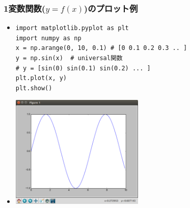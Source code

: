 \documentclass[10pt,dvipdfmx]{beamer}
\begin{document}
\begin{frame}[fragile]
\frametitle{1変数関数($y = f(x)$)のプロット例}
\begin{itemize}
\item []
\begin{lstlisting}[basicstyle=\ttfamily\scriptsize]
import matplotlib.pyplot as plt
import numpy as np
x = np.arange(0, 10, 0.1) # [0 0.1 0.2 0.3 .. ]
y = np.sin(x)  # universal関数
# y = [sin(0) sin(0.1) sin(0.2) ... ] 
plt.plot(x, y)
plt.show()
\end{lstlisting}

\item []
\begin{center}
\includegraphics[width=0.5\textwidth]{out/pdf/img/sin.pdf}
\end{center}
\end{itemize}
\end{frame}
\end{document}
